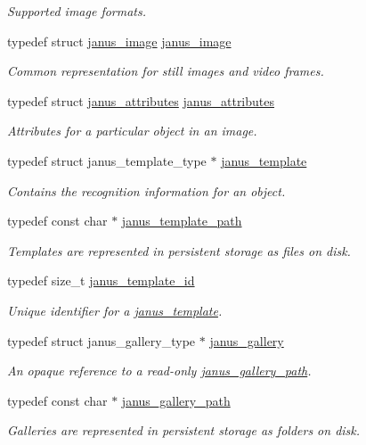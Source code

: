 \begin{DoxyCompactItemize}
\begin{DoxyCompactList}\small\item\em Supported image formats. \end{DoxyCompactList}\item 
typedef struct \hyperlink{structjanus__image}{janus\+\_\+image} \hyperlink{group__janus_gaea656fd6eccb34bf08ccedfb77be047d}{janus\+\_\+image}
\begin{DoxyCompactList}\small\item\em Common representation for still images and video frames. \end{DoxyCompactList}\item 
typedef struct \hyperlink{structjanus__attributes}{janus\+\_\+attributes} \hyperlink{group__janus_ga347f0a77da5b4654281af39cefc7aad3}{janus\+\_\+attributes}
\begin{DoxyCompactList}\small\item\em Attributes for a particular object in an image. \end{DoxyCompactList}\item 
typedef struct janus\+\_\+template\+\_\+type $\ast$ \hyperlink{group__janus_gaabac6b357615bbd03a082c714190e2d0}{janus\+\_\+template}
\begin{DoxyCompactList}\small\item\em Contains the recognition information for an object. \end{DoxyCompactList}\item 
typedef const char $\ast$ \hyperlink{group__janus_gad1ec012594c24085ba7110ad96a2db22}{janus\+\_\+template\+\_\+path}
\begin{DoxyCompactList}\small\item\em Templates are represented in persistent storage as files on disk. \end{DoxyCompactList}\item 
typedef size\+\_\+t \hyperlink{group__janus_ga666a973aaa28bebd89ea5da37853bb87}{janus\+\_\+template\+\_\+id}
\begin{DoxyCompactList}\small\item\em Unique identifier for a \hyperlink{group__janus_gaabac6b357615bbd03a082c714190e2d0}{janus\+\_\+template}. \end{DoxyCompactList}\item 
typedef struct janus\+\_\+gallery\+\_\+type $\ast$ \hyperlink{group__janus_ga64368fd83d5e9abfd9ef6ab6231866e8}{janus\+\_\+gallery}
\begin{DoxyCompactList}\small\item\em An opaque reference to a read-\/only \hyperlink{group__janus_ga59a8cde3e9e96f7e337f9e1ebf5b4eac}{janus\+\_\+gallery\+\_\+path}. \end{DoxyCompactList}\item 
typedef const char $\ast$ \hyperlink{group__janus_ga59a8cde3e9e96f7e337f9e1ebf5b4eac}{janus\+\_\+gallery\+\_\+path}
\begin{DoxyCompactList}\small\item\em Galleries are represented in persistent storage as folders on disk. \end{DoxyCompactList}\end{DoxyCompactItemize}
